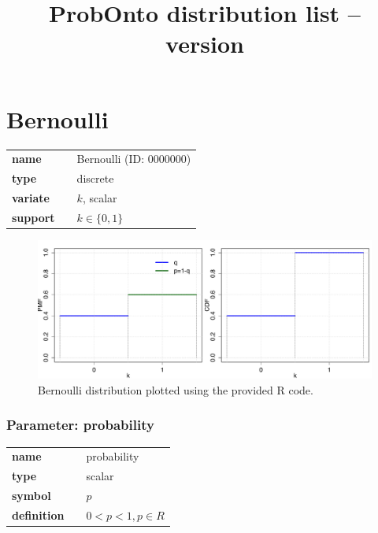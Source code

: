 \documentclass{article}
\begin{document}
\title{ProbOnto distribution list -- version}

\date{}

\maketitle

\section*{Bernoulli} 

  \bigskip 

\begin{tabular}{p{2cm}cl}
\textbf{name} & & Bernoulli (ID: 0000000)\\ 
 
\textbf{type} & & discrete \\ 

\textbf{variate} & & $k$, scalar \\ 

\textbf{support} & & $k \in \{0,1\}$
\end{tabular}

\begin{figure}[ht!]
\centering
  \includegraphics[width=140mm]{pics/Bernoulli.pdf}
 \caption{Bernoulli distribution plotted using the provided R code.}
 \label{fig:Bernoulli}
\end{figure}

\subsubsection*{Parameter: probability}

\noindent\begin{tabular}{p{2cm}cl}
\textbf{name} & & probability \\
\textbf{type} & & scalar \\
\textbf{symbol} & & $p$  \\
\textbf{definition} & & $0<p<1, p \in  R$
\end{tabular}
\end{document}
